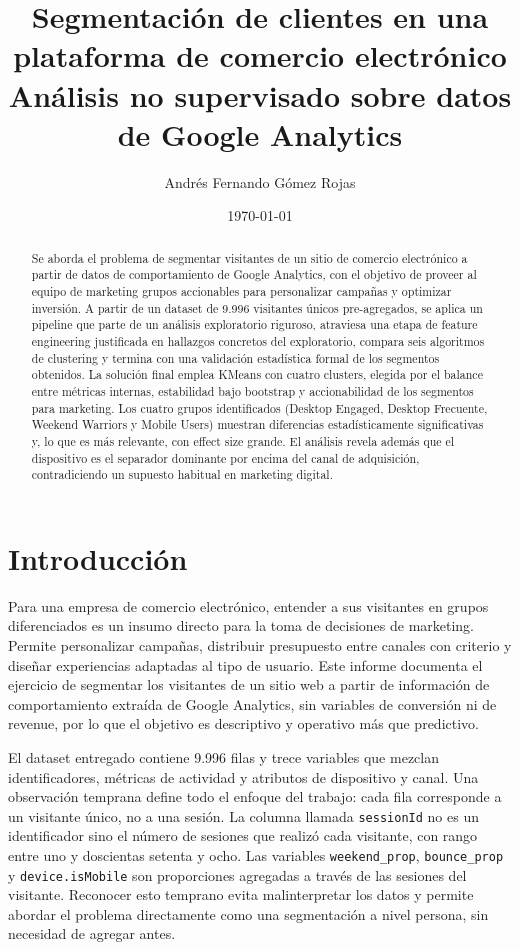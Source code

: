 \documentclass[11pt,a4paper]{article}
\title{\textbf{Segmentación de clientes en una plataforma de comercio electrónico}\\
\large Análisis no supervisado sobre datos de Google Analytics}
\author{Andrés Fernando Gómez Rojas}
\date{\today}
\begin{document}
\maketitle

\begin{abstract}
\noindent
Se aborda el problema de segmentar visitantes de un sitio de comercio electrónico
a partir de datos de comportamiento de Google Analytics, con el objetivo de
proveer al equipo de marketing grupos accionables para personalizar campañas y
optimizar inversión. A partir de un dataset de 9.996 visitantes únicos
pre-agregados, se aplica un pipeline que parte de un análisis exploratorio
riguroso, atraviesa una etapa de feature engineering justificada en hallazgos
concretos del exploratorio, compara seis algoritmos de clustering y termina con
una validación estadística formal de los segmentos obtenidos. La solución final
emplea KMeans con cuatro clusters, elegida por el balance entre métricas
internas, estabilidad bajo bootstrap y accionabilidad de los segmentos para
marketing. Los cuatro grupos identificados (Desktop Engaged, Desktop Frecuente,
Weekend Warriors y Mobile Users) muestran diferencias estadísticamente
significativas y, lo que es más relevante, con effect size grande. El análisis
revela además que el dispositivo es el separador dominante por encima del canal
de adquisición, contradiciendo un supuesto habitual en marketing digital.
\end{abstract}

\section{Introducción}

Para una empresa de comercio electrónico, entender a sus visitantes en grupos
diferenciados es un insumo directo para la toma de decisiones de marketing.
Permite personalizar campañas, distribuir presupuesto entre canales con criterio
y diseñar experiencias adaptadas al tipo de usuario. Este informe documenta el
ejercicio de segmentar los visitantes de un sitio web a partir de información de
comportamiento extraída de Google Analytics, sin variables de conversión ni de
revenue, por lo que el objetivo es descriptivo y operativo más que predictivo.

El dataset entregado contiene 9.996 filas y trece variables que mezclan
identificadores, métricas de actividad y atributos de dispositivo y canal. Una
observación temprana define todo el enfoque del trabajo: cada fila corresponde a
un visitante único, no a una sesión. La columna llamada \texttt{sessionId} no
es un identificador sino el número de sesiones que realizó cada visitante, con
rango entre uno y doscientas setenta y ocho. Las variables \texttt{weekend\_prop},
\texttt{bounce\_prop} y \texttt{device.isMobile} son proporciones agregadas a
través de las sesiones del visitante. Reconocer esto temprano evita malinterpretar
los datos y permite abordar el problema directamente como una segmentación a
nivel persona, sin necesidad de agregar antes.
\end{document}
